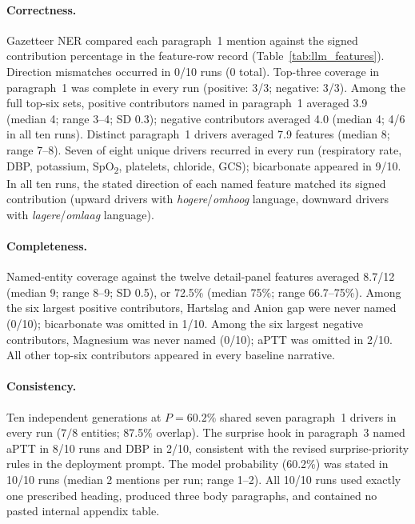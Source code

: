 \documentclass[12pt, a4paper]{article}
\begin{document}
\paragraph{Correctness.}
Gazetteer NER compared each paragraph~1 mention against the signed
contribution percentage in the feature-row record
(Table~\ref{tab:llm_features}). Direction mismatches occurred in
0/10 runs (0 total). Top-three coverage in paragraph~1 was complete in
every run (positive: 3/3; negative: 3/3). Among the full top-six sets,
positive contributors named in paragraph~1 averaged 3.9 (median 4; range
3--4; SD 0.3); negative contributors averaged 4.0 (median 4; 4/6 in all
ten runs). Distinct paragraph~1 drivers averaged 7.9 features (median 8;
range 7--8). Seven of eight unique drivers recurred in every run
(respiratory rate, DBP, potassium, SpO\textsubscript{2}, platelets, chloride,
GCS); bicarbonate appeared in 9/10. In all ten runs, the stated direction of
each named feature matched its signed contribution (upward drivers with
\emph{hogere}/\emph{omhoog} language, downward drivers with
\emph{lagere}/\emph{omlaag} language).

\paragraph{Completeness.}
Named-entity coverage against the twelve detail-panel features averaged
8.7/12 (median 9; range 8--9; SD 0.5), or 72.5\% (median 75\%; range
66.7--75\%). Among the six largest positive contributors, Hartslag and
Anion gap were never named (0/10); bicarbonate was omitted in 1/10. Among
the six largest negative contributors, Magnesium was never named (0/10);
aPTT was omitted in 2/10. All other top-six contributors appeared in every
baseline narrative.

\paragraph{Consistency.}
Ten independent generations at $P=60.2\%$ shared seven paragraph~1
drivers in every run ($7/8$ entities; 87.5\% overlap). The surprise hook
in paragraph~3 named aPTT in 8/10 runs and DBP in 2/10, consistent with
the revised surprise-priority rules in the deployment prompt. The model
probability (60.2\%) was stated in 10/10 runs (median 2 mentions per run;
range 1--2). All 10/10 runs used exactly one prescribed heading, produced
three body paragraphs, and contained no pasted internal appendix table.
\end{document}
